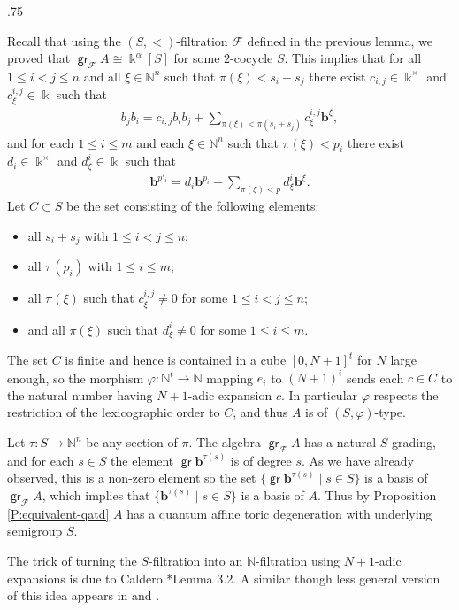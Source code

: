 \documentclass[11pt,fleqn]{article}
\makeatletter
\renewenvironment{proof}[1][\textit{Proof}]{\par
  \pushQED{\qed}%
  \normalfont \topsep.75\paraskip\relax
  \trivlist
  \item[\hskip\labelsep
        \itshape
    #1\@addpunct{.}]\ignorespaces
}{%
  \popQED\endtrivlist\@endpefalse
}
\newcommand\NN{\mathbb N}
\renewcommand\to{\longrightarrow}
\renewcommand\phi{\varphi}
\newcommand\F{\mathcal F}
\renewcommand\b{\mathbf b}
\renewcommand\k{\Bbbk}
\DeclareMathOperator\gr{\mathsf{gr}}
\makeatother
\begin{document}
\begin{proof}
Recall that using the $(S,<)$-filtration $\F$ defined in the previous lemma, we 
proved that $\gr_\F A \cong \k^\alpha[S]$ for some $2$-cocycle $S$. This implies that 
for all $1 \leq i < j \leq n$ and all $\xi \in \NN^n$ 
such that $\pi(\xi) < s_i +s_j$ there exist $c_{i,j} \in \k^\times$ and $c^{i,j}_\xi \in 
\k$ such that
\begin{align*}
  b_j b_i = c_{i,j} b_i b_j + \sum_{\pi(\xi) < \pi(s_i + s_j)} c^{i,j}_\xi
    \b^\xi,
\end{align*}
and for each $1 \leq i \leq m$ and each $\xi \in \NN^n$ such that $\pi(\xi) < p_i$ 
there exist $d_i \in \k^\times$ and $d^i_\xi \in \k$ such that
\begin{align*}
  \b^{p'_i} = d_i \b^{p_i} + \sum_{\pi(\xi) < p} d^i_\xi \b^\xi.
\end{align*}
Let $C \subset S$ be the set consisting of the following elements:
\begin{itemize}
\item all $s_i + s_j$ with $1 \leq i<j\leq n$;
\item all $\pi(p_i)$ with $1 \leq i \leq m$;
\item all $\pi(\xi)$ such that $c^{i,j}_\xi \neq 0$ for some $1 \leq i < j \leq n$;
\item and all $\pi(\xi)$ such that $d^i_\xi \neq 0$ for some $1 \leq i \leq m$.
\end{itemize}  
The set $C$ is finite and hence is contained in a cube $[0,N+1]^t$ for $N$ large enough, 
so the morphism $\phi: \NN^t \to \NN$ mapping $e_i$ to $(N+1)^i$ sends each $c \in C$ to 
the natural number having $N+1$-adic expansion $c$. In particular $\phi$ respects the 
restriction of the lexicographic order to $C$, and thus $A$ is of $(S,\phi)$-type. 

Let $\tau: S \to \NN^n$ be any section of $\pi$. The algebra $\gr_\F A$ has a natural 
$S$-grading, and for each $s \in S$ the element $\gr \b^{\tau(s)}$ is of degree $s$. As 
we have already observed, this is a non-zero element so the set $\{\gr \b^{\tau(s)} \mid 
s \in S\}$ is a basis of $\gr_\F A$, which implies that $\{\b^{\tau(s)} \mid s \in S\}$ 
is a basis of $A$. Thus by Proposition \ref{P:equivalent-qatd} $A$ has a quantum affine 
toric degeneration with underlying semigroup $S$.
\end{proof}

\begin{Remark*}
The trick of turning the $S$-filtration into an $\NN$-filtration using $N+1$-adic 
expansions is due to Caldero \cite{C}*{Lemma 3.2}. A similar though less general
version of this idea appears in \cite{GL} and \cite{RZ}.
\end{Remark*}
\end{document}
